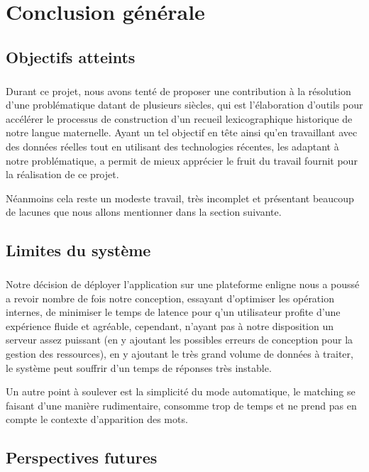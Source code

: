 \documentclass[]{report}
\begin{document}
\chapter{Conclusion générale}
	
	\section{Objectifs atteints}
	\paragraph{}
	Durant ce projet, nous avons tenté de proposer une contribution à la résolution d'une problématique datant de plusieurs siècles, qui est l'élaboration d'outils pour accélérer le processus de construction d'un recueil lexicographique historique de notre langue maternelle. Ayant un tel objectif en tête ainsi qu'en travaillant avec des données réelles tout en utilisant des technologies récentes, les adaptant à notre problématique, a permit de mieux apprécier le fruit du travail fournit pour la 
	réalisation de ce projet.
	\par 
	Néanmoins cela reste un modeste travail, très incomplet et présentant beaucoup de lacunes que nous allons mentionner dans la section suivante.
	\section{Limites du système}
		\paragraph{}
		Notre décision de déployer l'application sur une plateforme enligne nous a poussé a revoir nombre de fois notre conception, essayant d'optimiser les opération internes, de minimiser le temps de latence pour q'un utilisateur profite d'une expérience fluide et agréable, cependant, n'ayant pas à notre disposition un serveur assez puissant (en y ajoutant les possibles erreurs de conception pour la gestion des ressources), en y ajoutant le très grand volume de données à traiter, le système peut souffrir d'un temps de réponses très instable.
		\par 
		Un autre point à soulever est la simplicité du mode automatique, le matching se faisant d'une manière rudimentaire, consomme trop de temps et ne prend pas en compte le contexte d'apparition des mots.
	\section{Perspectives futures}		
\end{document}
